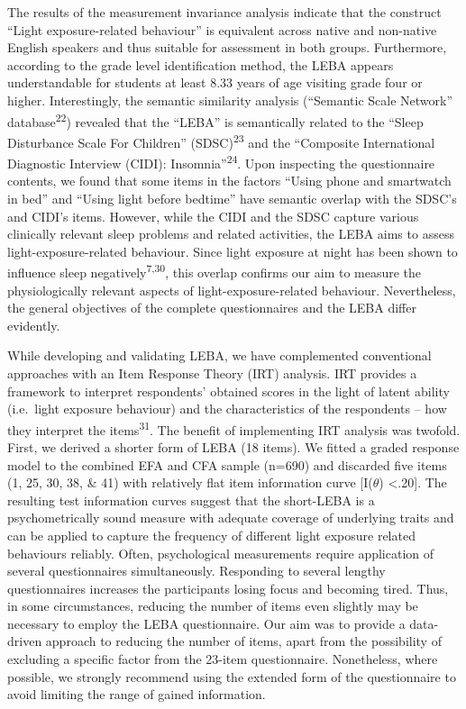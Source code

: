 \documentclass[
  man]{apa6}
\begin{document}
The results of the measurement invariance analysis indicate that the construct ``Light exposure-related behaviour'' is equivalent across native and non-native English speakers and thus suitable for assessment in both groups. Furthermore, according to the grade level identification method, the LEBA appears understandable for students at least 8.33 years of age visiting grade four or higher. Interestingly, the semantic similarity analysis (``Semantic Scale Network'' database\textsuperscript{22}) revealed that the ``LEBA'' is semantically related to the ``Sleep Disturbance Scale For Children'' (SDSC)\textsuperscript{23} and the ``Composite International Diagnostic Interview (CIDI): Insomnia''\textsuperscript{24}. Upon inspecting the questionnaire contents, we found that some items in the factors ``Using phone and smartwatch in bed'' and ``Using light before bedtime'' have semantic overlap with the SDSC's and CIDI's items. However, while the CIDI and the SDSC capture various clinically relevant sleep problems and related activities, the LEBA aims to assess light-exposure-related behaviour. Since light exposure at night has been shown to influence sleep negatively\textsuperscript{7,30}, this overlap confirms our aim to measure the physiologically relevant aspects of light-exposure-related behaviour. Nevertheless, the general objectives of the complete questionnaires and the LEBA differ evidently.

While developing and validating LEBA, we have complemented conventional approaches with an Item Response Theory (IRT) analysis. IRT provides a framework to interpret respondents' obtained scores in the light of latent ability (i.e.~light exposure behaviour) and the characteristics of the respondents -- how they interpret the items\textsuperscript{31}. The benefit of implementing IRT analysis was twofold. First, we derived a shorter form of LEBA (18 items). We fitted a graded response model to the combined EFA and CFA sample (n=690) and discarded five items (1, 25, 30, 38, \& 41) with relatively flat item information curve {[}I(\(\theta\)) \textless.20{]}. The resulting test information curves suggest that the short-LEBA is a psychometrically sound measure with adequate coverage of underlying traits and can be applied to capture the frequency of different light exposure related behaviours reliably. Often, psychological measurements require application of several questionnaires simultaneously. Responding to several lengthy questionnaires increases the participants losing focus and becoming tired. Thus, in some circumstances, reducing the number of items even slightly may be necessary to employ the LEBA questionnaire. Our aim was to provide a data-driven approach to reducing the number of items, apart from the possibility of excluding a specific factor from the 23-item questionnaire. Nonetheless, where possible, we strongly recommend using the extended form of the questionnaire to avoid limiting the range of gained information.
\end{document}
